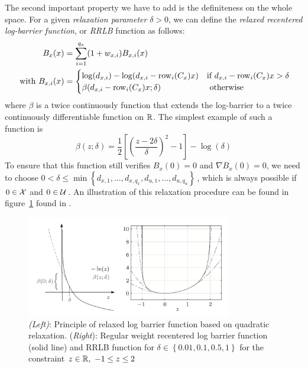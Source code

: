 \documentclass[12pt]{article}
\begin{document}
The second important property we have to add is the definiteness on the whole space.
For a given \textit{relaxation parameter} $\delta>0$, we can define the \textit{relaxed recentered log-barrier function}, or \textit{RRLB} function as follows:
\begin{align}
	\begin{split}
		\label{RRLB}
		B_x(x)&=\sum_{i=1}^{q_x}(1+w_{x,i})B_{x,i}(x)\\
		\text{ with }B_{x,i}(x)&=\begin{cases}
			\log(d_{x,i})-\log(d_{x,i}-\rm{row}_i(C_x)x)&\text{if }d_{x,i}-\rm{row}_i(C_x)x>\delta\\
			\beta(d_{x,i}-\rm{row}_i(C_x)x;\delta)&\text{ otherwise}
		\end{cases}
	\end{split}
\end{align}
where $\beta$ is a twice continuously function that extends the log-barrier to a twice continuously differentiable function on $\R$.
The simplest example of such a function is
$$\beta(z;\delta)=\frac{1}{2}\left[ \left( \frac{z-2\delta}{\delta} \right)^2-1 \right]-\log(\delta)$$
To ensure that this function still verifies $B_x(0)=0$ and $\nabla B_x(0)=0$, we need to choose $0<\delta\leq\min\left\{d_{x,1},\ldots,d_{x,q_x},d_{u,1},\ldots,d_{u,q_u}\right\}$\,, which is always possible if $0\in\cal{X}$ and $0\in\cal{U}$\,.
An illustration of this relaxation procedure can be found in figure~\ref{fig:RRLB-functions} found in \cite{rti-diehl}.

\begin{figure}
	\centering
	\includegraphics[width=0.8\textwidth]{images/rrlb-functions.png}
	\caption{\textit{(Left)}: Principle of relaxed log barrier function based on quadratic relaxation. (\textit{Right}): Regular weight recentered log barrier function (solid line) and RRLB function for $\delta\in\left\{ 0.01,0.1,0.5,1 \right\}$ for the constraint $z\in\R,~-1\leq z\leq 2$}
	\label{fig:RRLB-functions}
\end{figure}
\end{document}
